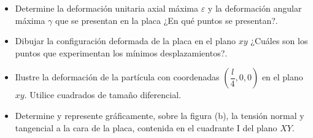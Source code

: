 \documentclass[../notas medios.tex]{subfiles}
\begin{document}
\begin{enumerate}
\begin{itemize}
	\item Determine la deformación unitaria axial máxima $\varepsilon$ y la deformación angular máxima $\gamma$ que se presentan en la placa ¿En qué puntos se presentan?.
	\item Dibujar la configuración deformada de la placa en el plano $xy$ ¿Cuáles son los puntos que experimentan los mínimos desplazamientos?.
	\item Ilustre la deformación de la partícula con coordenadas $\left( \dfrac{l}{4}, 0, 0 \right)$ en el plano $xy$. Utilice cuadrados de tamaño diferencial.
	\item Determine y represente gráficamente, sobre la figura (b), la tensión normal y tangencial a la cara de la placa, contenida en el cuadrante I del plano $XY$.
\end{itemize}

\end{enumerate}
\end{document}
